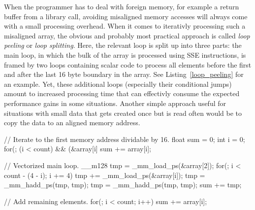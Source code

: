 When the programmer has to deal with foreign memory, for example a return buffer from a library call, avoiding misaligned memory accesses will always come with a small processing overhead. When it comes to iterativly processing such a misaligned array, the obvious and probably most practical approach is called \emph{loop peeling} or \emph{loop splitting}. Here, the relevant loop is split up into three parts: the main loop, in which the bulk of the array is processed using SSE instructions, is framed by two loops containing scalar code to process all elements before the first and after the last 16 byte boundary in the array. See Listing~\ref{loop_peeling} for an example. Yet, these additional loops (especially their conditional jumps) amount to increased processing time that can effectivly consume the expected performance gains in some situations. Another simple approach useful for situations with small data that gets created once but is read often would be to copy the data to an aligned memory address.

\begin{code}[caption={Loop peeling example}, label=loop_peeling]
  // Iterate to the first memory address dividable by 16.
  float sum = 0;
  int i = 0;
  for(; (i < count) && (&array[i] %
    sum += array[i];

  // Vectorized main loop.
  __m128 tmp = _mm_load_ps(&array[2]);
  for(; i < count - (4 - i); i += 4) {
    tmp += _mm_load_ps(&array[i]);
  }
  tmp = _mm_hadd_ps(tmp, tmp);
  tmp = _mm_hadd_ps(tmp, tmp);
  sum += tmp;

  // Add remaining elements.
  for(; i < count; i++)
    sum += array[i];
\end{code}

